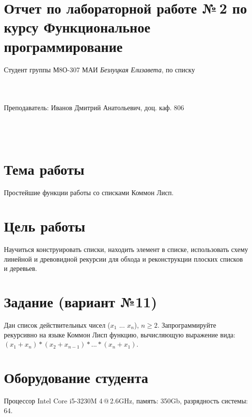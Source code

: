 \documentclass[12pt]{article}
\begin{document}
\section*{Отчет по лабораторной работе №\,2 
по курсу \guillemotleft  Функциональное программирование\guillemotright}
\begin{flushright}
Студент группы М8О-307 МАИ \textit{Безлуцкая Елизавета},  по списку \\
 \\
 \\
\ \\
Преподаватель: Иванов Дмитрий Анатольевич, доц. каф. 806 \\
 \\
 \\
 \\

\end{flushright}

\section{Тема работы}
Простейшие функции работы со списками Коммон Лисп.

\section{Цель работы}
Научиться конструировать списки, находить элемент в списке, использовать схему линейной и древовидной рекурсии для обхода и реконструкции плоских списков и деревьев.

\section{Задание (вариант №11)}
Дан список действительных чисел ($x_{1}$ ... $x_{n}$), \(n \geqslant 2\).
Запрограммируйте рекурсивно на языке Коммон Лисп функцию, вычисляющую выражение вида:\\

$(x_{1} + x_{n}) * (x_{2} + x_{n-1}) * ... * (x_{n} + x_{1})$.

\section{Оборудование студента}
Процессор Intel Core i5-3230M 4\,@\,2.6GHz, память: 350Gb, разрядность системы: 64.
\end{document}
